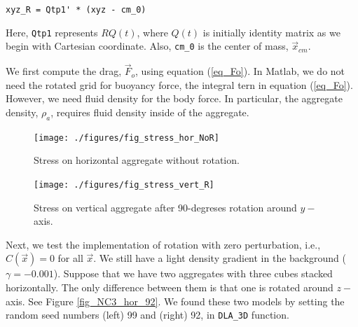 \begin{framed}
	\verb+xyz_R = Qtp1' * (xyz - cm_0)+
\end{framed}
\noindent
Here, \verb+Qtp1+ represents $R Q(t)$, where $Q(t)$ is initially identity matrix as we begin with Cartesian coordinate. Also, \verb+cm_0+ is the center of mass, $\vec{x}_{cm}.$
\par
We first compute the drag, $\vec{F}_o$, using equation (\ref{eq_Fo}). In Matlab, we do not need the rotated grid for buoyancy force, the integral tern in equation (\ref{eq_Fo}). However, we need fluid density for the body force. In particular, the aggregate density, $\rho_a$, requires fluid density inside of the aggregate. 
    \begin{figure}
    	\begin{center}
			\texttt{[image: ./figures/fig\_stress\_hor\_NoR]}
    	\caption{Stress on horizontal aggregate without rotation.}
    	\label{fig_stress_hor_NoR}
    \end{center}
    \end{figure}
    \begin{figure}
    	\begin{center}
			\texttt{[image: ./figures/fig\_stress\_vert\_R]}
    	\caption{Stress on vertical aggregate after 90-degreses rotation around $y-$ axis.}
    	\label{fig_stress_vert_R}
    \end{center}
    \end{figure}
\par
Next, we test the implementation of rotation with zero perturbation, 
i.e.,  $C(\vec{x}) = 0$ for all $\vec{x}$. 
We still have a light density gradient in the background ($\gamma = - 0.001$). 
Suppose that we have two aggregates with three cubes stacked horizontally.
The only difference between them is that one is rotated around $z-$axis. 
See Figure \ref{fig_NC3_hor_92}. 
We found these two models by setting the random seed numbers (left) 99 
and (right) 92, in \verb+DLA_3D+ function. 
